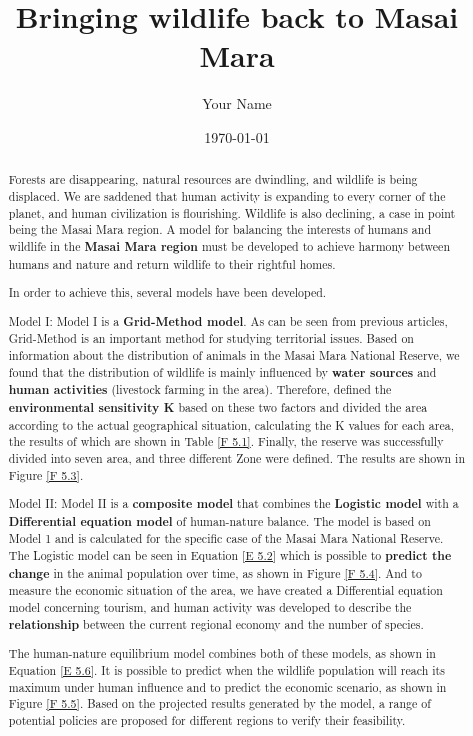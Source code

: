 \documentclass{mcmthesis}
\title{Bringing wildlife back to Masai Mara}
\author{Your Name}
\date{\today}
\numberwithin{figure}{section}
\numberwithin{table}{section}
\numberwithin{equation}{section}
\begin{document}
\begin{abstract}
	Forests are disappearing, natural resources are dwindling, and wildlife is being displaced. We are saddened that human activity is expanding to every corner of the planet, and human civilization is flourishing. Wildlife is also declining, a case in point being the Masai Mara region. A model for balancing the interests of humans and wildlife in the  \textbf{Masai Mara region} must be developed to achieve harmony between humans and nature and return wildlife to their rightful homes. 

	In order to achieve this, several models have been developed. 
	
	Model I: Model I is a \textbf{Grid-Method model}. As can be seen from previous articles, Grid-Method is an important method for studying territorial issues. Based on information about the distribution of animals in the Masai Mara National Reserve, we found that the distribution of wildlife is mainly influenced by \textbf{water sources} and \textbf{human activities} (livestock farming in the area). Therefore, defined the \textbf{environmental sensitivity K} based on these two factors and divided the area according to the actual geographical situation, calculating the K values for each area, the results of which are shown in Table \ref{F 5.1}. Finally, the reserve was successfully divided into seven area, and three different Zone were defined. The results are shown in Figure \ref{F 5.3}.
	
	Model II: Model II is a \textbf{composite model} that combines the \textbf{Logistic model} with a \textbf{Differential equation model} of human-nature balance. The model is based on Model 1 and is calculated for the specific case of the Masai Mara National Reserve. The Logistic model can be seen in Equation \ref{E 5.2} which is possible to \textbf{predict the change} in the animal population over time, as shown in Figure \ref{F 5.4}. And to measure the economic situation of the area, we have created a Differential equation model concerning tourism, and human activity was developed to describe the \textbf{relationship} between the current regional economy and the number of species.
	
	The human-nature equilibrium model combines both of these models, as shown in Equation \ref{E 5.6}. It is possible to predict when the wildlife population will reach its maximum under human influence and to predict the economic scenario, as shown in Figure \ref{F 5.5}. Based on the projected results generated by the model, a range of potential policies are proposed for different regions to verify their feasibility.
	

\end{abstract}
\end{document}
